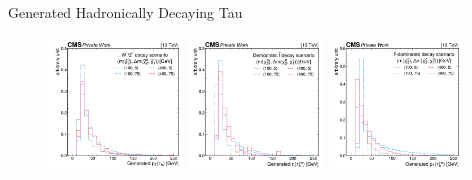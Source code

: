 \begin{frame}[fragile]{Generated Hadronically Decaying Tau \pt}
  \begin{figure}[htpb]
    \centering
    \includegraphics[width=0.32\textwidth]{fig/sig/Sig_wz_GenVisHadTauPt.pdf}
    \includegraphics[width=0.32\textwidth]{fig/sig/Sig_democratic_GenVisHadTauPt.pdf}
    \includegraphics[width=0.32\textwidth]{fig/sig/Sig_stau_GenVisHadTauPt.pdf}
  \end{figure}	
\end{frame}


